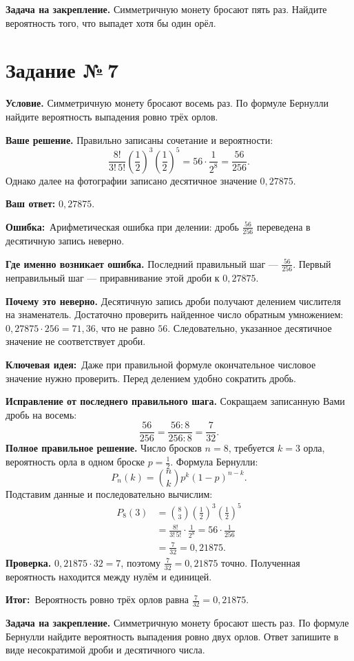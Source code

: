 \documentclass[a4paper,12pt]{article}
\newcommand{\errlabel}{\textcolor{err}{\textbf{Ошибка:}}}
\newcommand{\keylabel}{\textcolor{accent}{\textbf{Ключевая идея:}}}
\newcommand{\outcomelabel}{\textcolor{accent}{\textbf{Итог:}}}
\newcommand{\reviewtask}[1]{\clearpage\phantomsection\label{task:#1}\section*{\textcolor{accent}{Задание №\,#1}}}
\begin{document}
\textbf{Задача на закрепление.} Симметричную монету бросают пять раз. Найдите вероятность того, что выпадет хотя бы один орёл.

\reviewtask{7}
\textbf{Условие.} Симметричную монету бросают восемь раз. По формуле Бернулли найдите вероятность выпадения ровно трёх орлов.

\textbf{Ваше решение.} Правильно записаны сочетание и вероятности:
\[
\frac{8!}{3!\,5!}\left(\frac12\right)^3\left(\frac12\right)^5
=56\cdot\frac1{2^8}=\frac{56}{256}.
\]
Однако далее на фотографии записано десятичное значение $0{,}27875$.

\textbf{Ваш ответ:} $0{,}27875$.

\errlabel\ Арифметическая ошибка при делении: дробь $\frac{56}{256}$ переведена в десятичную запись неверно.

\textbf{Где именно возникает ошибка.} Последний правильный шаг --- $\frac{56}{256}$. Первый неправильный шаг --- приравнивание этой дроби к $0{,}27875$.

\textbf{Почему это неверно.} Десятичную запись дроби получают делением числителя на знаменатель. Достаточно проверить найденное число обратным умножением: $0{,}27875\cdot256=71{,}36$, что не равно $56$. Следовательно, указанное десятичное значение не соответствует дроби.

\keylabel\ Даже при правильной формуле окончательное числовое значение нужно проверить. Перед делением удобно сократить дробь.

\textbf{Исправление от последнего правильного шага.} Сокращаем записанную Вами дробь на восемь:
\[
\frac{56}{256}=\frac{56:8}{256:8}=\frac7{32}.
\]
\textbf{Полное правильное решение.} Число бросков $n=8$, требуется $k=3$ орла, вероятность орла в одном броске $p=\frac12$. Формула Бернулли:
\[
P_n(k)=\binom nk p^k(1-p)^{n-k}.
\]
Подставим данные и последовательно вычислим:
\begin{align*}
P_8(3)
&=\binom83\left(\frac12\right)^3\left(\frac12\right)^5\\
&=\frac{8!}{3!\,5!}\cdot\frac1{2^8}
=56\cdot\frac1{256}\\
&=\frac7{32}=0{,}21875.
\end{align*}
\textbf{Проверка.} $0{,}21875\cdot32=7$, поэтому $\frac7{32}=0{,}21875$ точно. Полученная вероятность находится между нулём и единицей.

\outcomelabel\ Вероятность ровно трёх орлов равна $\boxed{\frac7{32}=0{,}21875}$.

\textbf{Задача на закрепление.} Симметричную монету бросают шесть раз. По формуле Бернулли найдите вероятность выпадения ровно двух орлов. Ответ запишите в виде несократимой дроби и десятичного числа.
\end{document}
